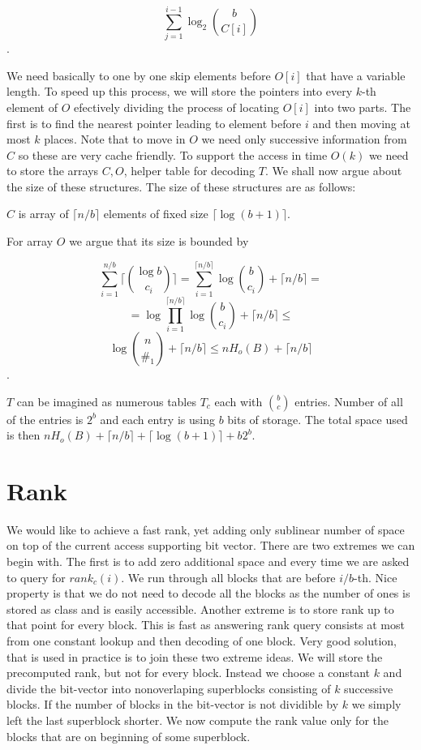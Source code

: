                     $$\sum_{j=1}^{i-1} \log_2{b\choose C[i]}$$.

We need basically to one by one skip elements before $O[i]$ that have a variable
length. To speed up this process, we will store the pointers into every $k$-th
element of $O$ efectively dividing the process of locating $O[i]$ into two parts.
The first is to find the nearest pointer leading to element before $i$ and then
moving at most $k$ places. Note that to move in $O$ we need only successive
information from $C$ so these are very cache friendly. To support the access in
time $O(k)$ we need to store the arrays $C, O$, helper table for decoding $T$.
We shall now argue about the size of these structures. The size of these structures
are as follows:

$C$ is array of $\lceil n/b \rceil$ elements of fixed size $\lceil \log(b+1) \rceil$.

For array $O$ we argue that its size is bounded by

$$\sum_{i=1}^{n/b} \bigg\lceil{\log b\choose c_i}\bigg\rceil =
\sum_{i=1}^{\lceil n/b \rceil} \log {b\choose c_i} + \lceil n/b \rceil =$$
$$=\log\prod_{i=1}^{\lceil n/b \rceil} \log {b\choose c_i} + \lceil n/b \rceil \leq $$
$$\log{n\choose \#_1} +  \lceil n/b \rceil \leq nH_o(B) +  \lceil n/b \rceil$$.

$T$ can be imagined as numerous tables $T_c$ each with ${b\choose c}$ entries.
Number of  all of the entries is $2^b$ and each entry is using $b$ bits of storage.
The total space used is then $nH_o(B) +  \lceil n/b \rceil + \lceil \log(b+1) \rceil + b2^b$.

\section{Rank}

We would like to achieve a fast rank, yet adding only sublinear number of space on top of the
current access supporting bit vector. There are two extremes we can begin with. The first is to
add zero additional space and every time we are asked to query for $rank_c(i)$. We run through
all blocks that are before $i/b$-th. Nice property is that we do not need to decode all the blocks
as the number of ones is stored as class and is easily accessible.
Another extreme is to store rank up to that point for every block. This is fast as answering rank
query consists at most from one constant lookup and then decoding of one block.
Very good solution, that is used in practice is to join these two extreme ideas. We will store the
precomputed rank, but not for every block. Instead we choose a constant $k$ and divide
the bit-vector into nonoverlaping superblocks consisting of $k$ successive blocks. If the number of
blocks in the bit-vector is not dividible by $k$ we simply left the last superblock shorter.
We now compute the rank value only for the blocks that are on beginning of some superblock.

